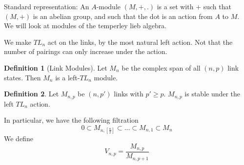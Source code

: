 \documentclass[a4paper]{book}
\theoremstyle{definition}
\newtheorem{definition}{Definition}[section]
\theoremstyle{remark}
\begin{document}
Standard representation: An $A$-module $(M,+,.)$ is a set with $+$ such that $(M,+)$ is an abelian group, and such that the dot is an action from $A$ to $M$. We will look at modules of the temperley lieb algebra. 

We make $TL_n$ act on the links, by the most natural left action. Not that the number of pairings can only increase under the action. 

\begin{definition}[Link Modules]
    Let $M_n$ be the complex span of all $(n,p)$ link states. Then $M_n$ is a left-$TL_n$ module. 
\end{definition}
\begin{definition}
    Let $M_{n,p}$ be $(n,p')$ links with $p'\geq p$. $M_{n,p}$ is stable under the left $TL_n$ action. 
\end{definition}
In particular, we have the following filtration 
\begin{equation}
    0 \subset M_{n, [\frac{n}{2}]} \subset \dots \subset M_{n,1} \subset M_n
\end{equation}
We define 
\begin{equation}
    V_{n,p} = \frac{M_{n,p}}{M_{n,p+1}}
\end{equation}
\end{document}
